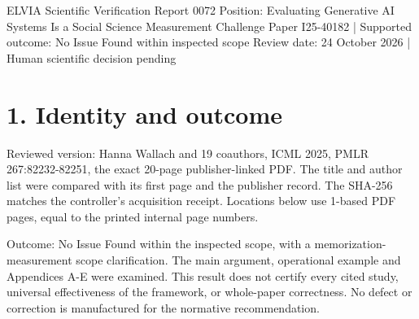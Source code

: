 \documentclass[10pt]{article}
\begin{document}
ELVIA Scientific Verification Report 0072
Position: Evaluating Generative AI Systems Is a Social Science Measurement Challenge
Paper I25-40182 | Supported outcome: No Issue Found within inspected scope
Review date: 24 October 2026 | Human scientific decision pending\par
\section*{1. Identity and outcome}
Reviewed version: Hanna Wallach and 19 coauthors, ICML 2025, PMLR 267:82232-82251, the exact 20-page publisher-linked PDF. The title and author list were compared with its first page and the publisher record. The SHA-256 matches the controller’s acquisition receipt. Locations below use 1-based PDF pages, equal to the printed internal page numbers.\par
Outcome: No Issue Found within the inspected scope, with a memorization-measurement scope clarification. The main argument, operational example and Appendices A-E were examined. This result does not certify every cited study, universal effectiveness of the framework, or whole-paper correctness. No defect or correction is manufactured for the normative recommendation.\par
\end{document}

